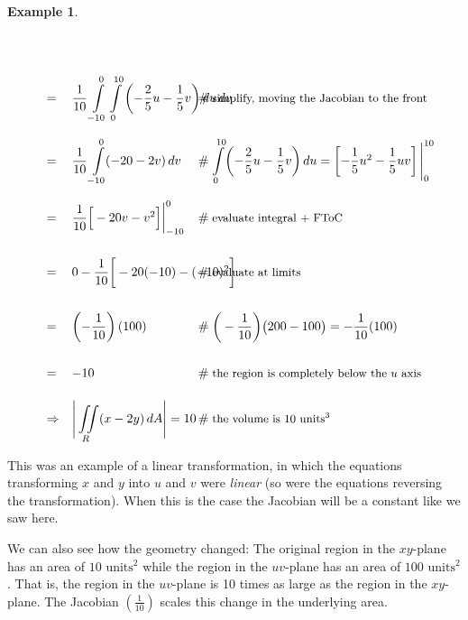 \documentclass{article}
\theoremstyle{definition}
\newtheorem{example}{Example}[section]
\begin{document}
\begin{example}
\begin{equation*}
\begin{array}{lllll}
\\
[25pt]
&=& {\displaystyle \dfrac{1}{10} \int\limits_{-10}^{0} \int\limits_{0}^{10}}
    \left ( - \dfrac{2}{5} u - \dfrac{1}{5} v \right ) du \, dv
			&\hspace{-4em} \mathrel{\#} \text{\small simplify, moving the Jacobian to the front} \\
[25pt]
&=& {\displaystyle \dfrac{1}{10} \int\limits_{-10}^{0} \! (-20 -2v) \,dv}
			&\hspace{-4em} \mathrel{\#} {\small {\displaystyle \int\limits_{0}^{10} \! \left ( - \dfrac{2}{5} u - \dfrac{1}{5} v \right ) du}
			= \left [ - \dfrac{1}{5} u^2 - \dfrac{1}{5} uv \right ] \Bigg |_{0}^{10}} \\
[25pt]
&=& \dfrac{1}{10} \Big [ -20 v - v^2 \Big ] \bigg |_{-10}^{0}
			&\hspace{-4em} \mathrel{\#} \text{\small evaluate integral + FToC} \\
[25pt]
&=& 0 - \dfrac{1}{10}  \bigg [ - 20 (-10) - (-10)^2  \bigg ] 
			&\hspace{-4em} \mathrel{\#} \text{\small evaluate at limits} \\
[25pt]
&=& \left (-\dfrac{1}{10} \right ) (100)
			&\hspace{-4em} \mathrel{\#} {\small \bigg ( - \dfrac{1}{10} \bigg ) \big ( 200 - 100 \big ) = -\dfrac{1}{10} (100)}\\
[25pt]
&=& -10
			&\hspace{-4em} \mathrel{\#} \text{\small the region is completely below the $u$ axis} \\
[15pt]
&\Rightarrow& {\displaystyle \Bigg | \iint\limits_{R} (x - 2y) \, dA} \Bigg | = 10
			&\hspace{-4em} \mathrel{\#} \text{\small the volume is $10 \text{ units}^3$} \\

\end{array}
\end{equation*}

 

\bigskip
\noindent
This was an example of a linear transformation, 
in which the equations transforming $x$ and $y$ into $u$ and 
$v$ were \emph{linear} (so were the equations reversing the
transformation). When this is the case the Jacobian will be 
a constant like we saw here.

\bigskip
{}
\noindent
We can also see how the geometry changed: The original region in
the $xy$-plane has an area of $10 \text{ units}^2$ while the
region in the $uv$-plane has an area of $100 \text{ units}^2$.
That is, the region in the $uv$-plane is 10 times as large as the
region in the $xy$-plane. The Jacobian $\left (\frac{1}{10}
\right )$ scales this change in the underlying area.


\end{example}
\end{document}
